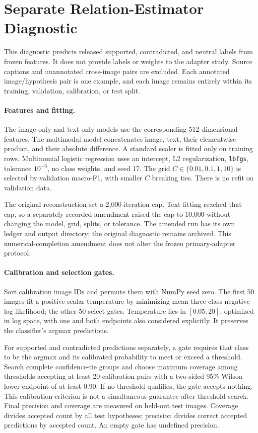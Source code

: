 \section{Separate Relation-Estimator Diagnostic}
\label{app:diagnostic}
This diagnostic predicts released supported, contradicted, and neutral labels from frozen features. It does not provide labels or weights to the adapter study. Source captions and unannotated cross-image pairs are excluded. Each annotated image/hypothesis pair is one example, and each image remains entirely within its training, validation, calibration, or test split.

\paragraph{Features and fitting.}
The image-only and text-only models use the corresponding 512-dimensional features. The multimodal model concatenates image, text, their elementwise product, and their absolute difference. A standard scaler is fitted only on training rows. Multinomial logistic regression uses an intercept, L2 regularization, \texttt{lbfgs}, tolerance $10^{-6}$, no class weights, and seed 17. The grid $C\in\{0.01,0.1,1,10\}$ is selected by validation macro-F1, with smaller $C$ breaking ties. There is no refit on validation data.

The original reconstruction set a 2,000-iteration cap. Text fitting reached that cap, so a separately recorded amendment raised the cap to 10,000 without changing the model, grid, splits, or tolerance. The amended run has its own ledger and output directory; the original diagnostic remains archived. This numerical-completion amendment does not alter the frozen primary-adapter protocol.

\paragraph{Calibration and selection gates.}
Sort calibration image IDs and permute them with NumPy seed zero. The first 50 images fit a positive scalar temperature by minimizing mean three-class negative log likelihood; the other 50 select gates. Temperature lies in $[0.05,20]$, optimized in log space, with one and both endpoints also considered explicitly. It preserves the classifier's argmax predictions.

For supported and contradicted predictions separately, a gate requires that class to be the argmax and its calibrated probability to meet or exceed a threshold. Search complete confidence-tie groups and choose maximum coverage among thresholds accepting at least 20 calibration pairs with a two-sided 95\% Wilson lower endpoint of at least 0.90. If no threshold qualifies, the gate accepts nothing. This calibration criterion is not a simultaneous guarantee after threshold search. Final precision and coverage are measured on held-out test images. Coverage divides accepted count by all test hypotheses; precision divides correct accepted predictions by accepted count. An empty gate has undefined precision.

